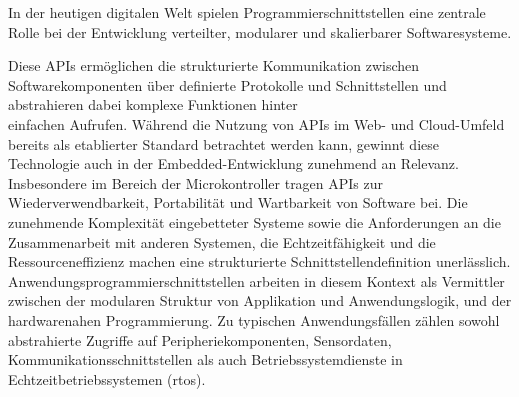 

In der heutigen digitalen Welt spielen Programmierschnittstellen eine zentrale Rolle bei der Entwicklung verteilter, modularer und skalierbarer Softwaresysteme. 

Diese APIs ermöglichen die strukturierte Kommunikation zwischen Softwarekomponenten über definierte Protokolle und Schnittstellen und abstrahieren dabei komplexe Funktionen hinter\\ einfachen Aufrufen.
Während die Nutzung von APIs im Web- und Cloud-Umfeld bereits als etablierter Standard betrachtet werden kann, gewinnt diese Technologie auch in der Embedded-Entwicklung zunehmend an Relevanz.
Insbesondere im Bereich der Microkontroller tragen APIs zur Wiederverwendbarkeit, Portabilität und Wartbarkeit von Software bei.
Die zunehmende Komplexität eingebetteter Systeme sowie die Anforderungen an die Zusammenarbeit mit anderen Systemen, die Echtzeitfähigkeit und  die Ressourceneffizienz machen eine strukturierte Schnittstellendefinition unerlässlich.
Anwendungsprogrammierschnittstellen arbeiten in diesem Kontext als Vermittler zwischen der modularen Struktur von Applikation und Anwendungslogik, und der hardwarenahen Programmierung.
Zu typischen Anwendungsfällen zählen sowohl abstrahierte Zugriffe auf Peripheriekomponenten, Sensordaten, Kommunikationsschnittstellen als auch Betriebssystemdienste in Echtzeitbetriebssystemen (\gls{rtos}).
